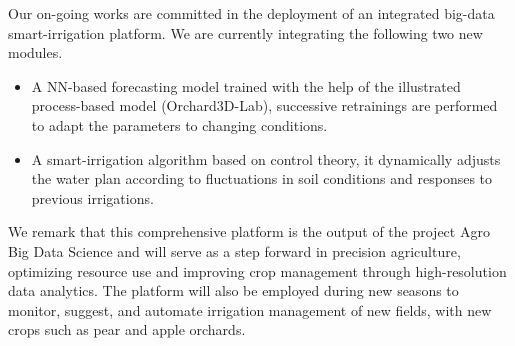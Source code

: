 Our on-going works are committed in the deployment of an integrated big-data smart-irrigation platform.
We are currently integrating the following two new modules.
\begin{itemize}
    \item A NN-based forecasting model trained with the help of the illustrated process-based model (Orchard3D-Lab), successive retrainings are performed to adapt the parameters to changing conditions.
    \item A smart-irrigation algorithm based on control theory, it dynamically adjusts the water plan according to fluctuations in soil conditions and responses to previous irrigations.
\end{itemize}
We remark that this comprehensive platform is the output of the project Agro Big Data Science \cite{ABDS} and will serve as a step forward in precision agriculture, optimizing resource use and improving crop management through high-resolution data analytics.
The platform will also be employed during new seasons to monitor, suggest, and automate irrigation management of new fields, with new crops such as pear and apple orchards.

